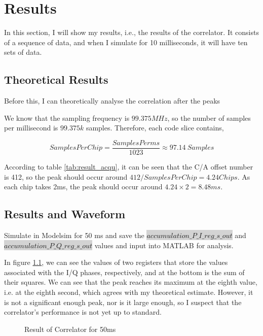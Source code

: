 \myClearDoublePage
\chapter{Results}
In this section, I will show my results, i.e., the results of the correlator. It consists of a sequence of data, and when I simulate for 10 milliseconds, it will have ten sets of data.

\section{Theoretical Results}
Before this, I can theoretically analyse the correlation after the peaks

We know that the sampling frequency is $99.375MHz$, so the number of samples per millisecond is $99.375k$ samples. Therefore, each code slice contains,

\begin{equation}
    SamplesPerChip=\frac{SamplesPerms}{1023} \approx 97.14\ Samples
\end{equation}

According to table \ref{tab:result_acqu}, it can be seen that the C/A offset number is 412, so the peak should occur around $412/SamplesPerChip=4.24Chips$. As each chip takes 2ms, the peak should occur around $4.24\times 2=8.48ms$.

\section{Results and Waveform}
\label{sec:results_waveform}
Simulate in Modelsim for 50 ms and save the \colorbox{lightgray}{$accumulation\_P\_I\_reg\_s\_out$} and\\ \colorbox{lightgray}{$accumulation\_P\_Q\_reg\_s\_out$} values and input into MATLAB for analysis.

In figure \ref{fig:result_50}, we can see the values of two registers that store the values associated with the I/Q phases, respectively, and at the bottom is the sum of their squares. We can see that the peak reaches its maximum at the eighth value, i.e. at the eighth second, which agrees with my theoretical estimate. However, it is not a significant enough peak, nor is it large enough, so I suspect that the correlator's performance is not yet up to standard.

\begin{figure}[!htbp]
    \centering
    
    \caption{Result of Correlator for 50ms}
    \label{fig:result_50}
\end{figure}
